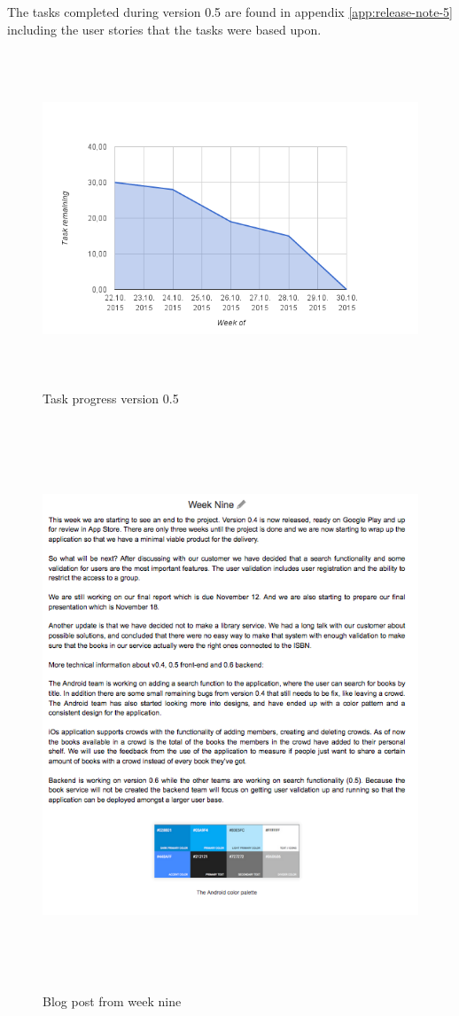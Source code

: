 The tasks completed during version 0.5 are found in appendix \ref{app:release-note-5} including the user stories that the tasks were based upon. 

\begin{figure}
\centering
\includegraphics[height=10cm]{figs/v05/version-progress-5.png}
\caption{Task progress version 0.5}
\label{fig:version-progress-5}
\end{figure}

\begin{figure}
\centering
\includegraphics[height=17cm]{figs/v05/weekNine.png}
\caption{Blog post from week nine}
\label{fig:week-nine}
\end{figure}

